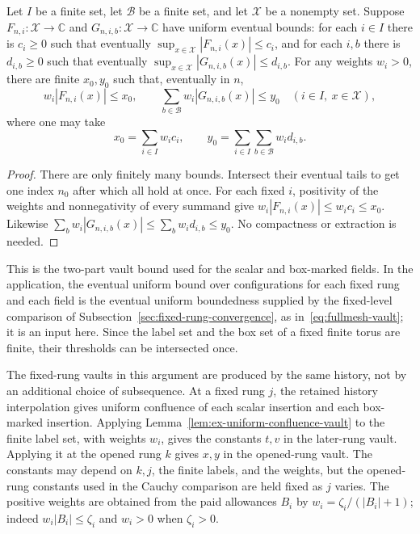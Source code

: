 \begin{lemma}
\label{lem:ex-uniform-confluence-vault}
Let $I$ be a finite set, let $\mathcal B$ be a finite set, and let $\mathcal X$
be a nonempty set. Suppose $F_{n,i}:\mathcal X\to\mathbb C$ and
$G_{n,i,b}:\mathcal X\to\mathbb C$ have uniform eventual bounds: for each
$i\in I$ there is $c_i\geq0$ such that eventually
$\sup_{x\in\mathcal X}|F_{n,i}(x)|\leq c_i$, and for each $i,b$ there is
$d_{i,b}\geq0$ such that eventually
$\sup_{x\in\mathcal X}|G_{n,i,b}(x)|\leq d_{i,b}$. For any weights
$w_i>0$, there are finite $x_0,y_0$ such that, eventually in $n$,
\[
 w_i|F_{n,i}(x)|\leq x_0,\qquad
 \sum_{b\in\mathcal B}w_i|G_{n,i,b}(x)|\leq y_0
 \quad(i\in I,\ x\in\mathcal X),
\]
where one may take
\[
 x_0=\sum_{i\in I}w_i c_i,
 \qquad y_0=\sum_{i\in I}\sum_{b\in\mathcal B}w_i d_{i,b}.
 \]
\end{lemma}
\begin{proof}
There are only finitely many bounds. Intersect their eventual tails to get one
index $n_0$ after which all hold at once. For each fixed $i$, positivity of
the weights and nonnegativity of every summand give
$w_i|F_{n,i}(x)|\leq w_i c_i\leq x_0$. Likewise
$\sum_b w_i|G_{n,i,b}(x)|\leq\sum_b w_i d_{i,b}\leq y_0$.
No compactness or extraction is needed.
\end{proof}

This is the two-part vault bound used for the scalar and box-marked fields.
In the application, the eventual uniform bound over configurations for each
fixed rung and each field is the eventual uniform boundedness supplied by
the fixed-level comparison of Subsection~\ref{sec:fixed-rung-convergence}, as
in~\eqref{eq:fullmesh-vault}; it is an input here. Since the label set and
the box set of a fixed finite torus are finite, their thresholds can be
intersected once.

The fixed-rung vaults in this argument are produced by the same history, not
by an additional choice of subsequence. At a fixed rung $j$, the retained
history interpolation gives uniform confluence of each scalar insertion and
each box-marked insertion. Applying Lemma~\ref{lem:ex-uniform-confluence-vault}
to the finite label set, with weights $w_i$, gives the constants $t,v$ in the
later-rung vault. Applying it at the opened rung $k$ gives $x,y$ in the
opened-rung vault. The constants may depend on $k,j$, the finite labels, and
the weights, but the opened-rung constants used in the Cauchy comparison are
held fixed as $j$ varies. The positive weights are obtained from the paid
allowances $B_i$ by $w_i=\zeta_i/(|B_i|+1)$; indeed
$w_i|B_i|\leq\zeta_i$ and $w_i>0$ when $\zeta_i>0$.

